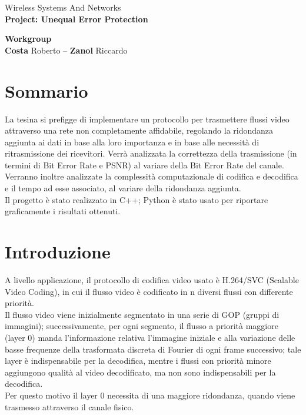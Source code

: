 \documentclass[italian, 11pt]{article}
\newcommand{\horline}{\rule{1\linewidth}{0.9pt}}
\begin{document}
\begin{center}
	\Large Wireless Systems And Networks\\
	\huge \textbf{Project: Unequal Error Protection}\\[3mm]
	\begin{framed}
		\Large \textbf{Workgroup} \\[2mm]
		\normalsize \textbf{Costa} Roberto -- \textbf{Zanol} Riccardo
	\end{framed}
\end{center}	
\FloatBarrier
\section{Sommario}
La tesina si prefigge di implementare un protocollo per trasmettere flussi video attraverso una rete non completamente affidabile, regolando la ridondanza aggiunta ai dati in base alla loro importanza e in base alle necessità di ritrasmissione dei ricevitori.
Verrà analizzata la correttezza della trasmissione (in termini di Bit Error Rate e PSNR) al variare della Bit Error Rate del canale. Verranno inoltre analizzate la complessità computazionale di codifica e decodifica e il tempo ad esse associato, al variare della ridondanza aggiunta.\\
Il progetto è stato realizzato in C++; Python è stato usato per riportare graficamente i risultati ottenuti.
\section{Introduzione}
A livello applicazione, il protocollo di codifica video usato è H.264/SVC (Scalable Video Coding), in cui il flusso video è codificato in n diversi flussi con differente priorità.\\
Il flusso video viene inizialmente segmentato in una serie di GOP (gruppi di immagini); successivamente, per ogni segmento, il flusso a priorità maggiore (layer 0) manda l'informazione relativa l'immagine iniziale e alla variazione delle basse frequenze della trasformata discreta di Fourier di ogni frame successivo; tale layer è indispensabile per la decodifica, mentre i flussi con priorità minore aggiungono qualità al video decodificato, ma non sono indispensabili per la decodifica.\\
Per questo motivo il layer 0 necessita di una maggiore ridondanza, quando viene trasmesso attraverso il canale fisico.\\
\end{document}
